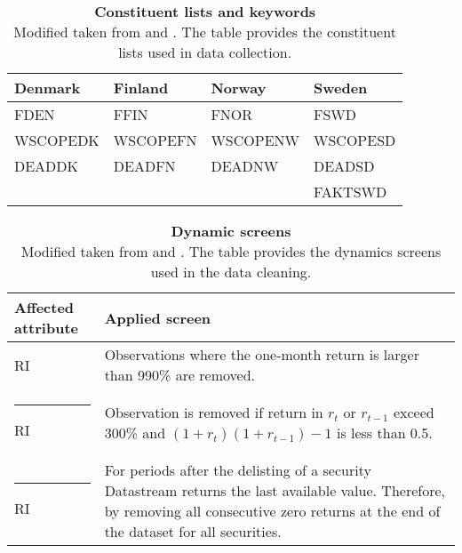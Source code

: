 \documentclass[12pt]{article}
\begin{document}
\begin{appendices}
\begin{table}[H] 
\footnotesize
\caption[Constituent lists and keywords]{\textbf{Constituent lists and keywords}\\ Modified taken from \protect\citet{Ince2006} and \protect\citet{HANAUER2023106712}. The table provides the constituent lists used in data collection.}
 \label{table:constituteLists}
\centering
\begin{tabularx}{\textwidth}{X X X X}
\toprule
Denmark & Finland & Norway & Sweden \\
\midrule
FDEN 		&  FFIN		& FNOR		& FSWD\\
WSCOPEDK & WSCOPEFN & WSCOPENW& WSCOPESD\\
DEADDK 	&   DEADFN 	& DEADNW 	& DEADSD\\
& & & FAKTSWD\\
 \bottomrule
 \end{tabularx}
 \end{table} 
 
\begin{table}[H] 
\footnotesize
\caption[Dynamic screens]{\textbf{Dynamic screens}\\ Modified taken from \protect\citet{Ince2006} and \protect\citet{HANAUER2023106712}. The table provides the dynamics screens used in the data cleaning.}
 \label{table:DynamicScreens}
\centering
\begin{tabularx}{\textwidth}{l X}
\toprule
Affected attribute & Applied screen \\
\midrule
RI 		& Observations where the one-month return is larger than 990\% are removed.\\ \rule{-1ex}{3ex}
RI		& Observation is removed if return in $r_t$ or $r_{t-1}$ exceed 300\% and $(1+r_{t})(1+r_{t-1}) -1$ is less than 0.5. \\ \rule{-1ex}{3ex}
RI 		& For periods after the delisting of a security Datastream returns the last available value. Therefore, by removing all consecutive zero returns at the end of the dataset for all securities.\\
 \bottomrule
 \end{tabularx}
 \end{table} 


\end{appendices}
\end{document}
